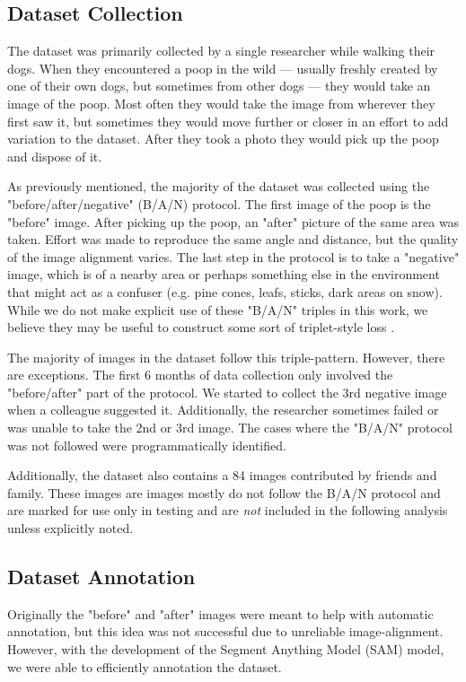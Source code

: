 \documentclass[10pt,twocolumn,letterpaper]{article}
\begin{document}
\subsection{Dataset Collection}

The dataset was primarily collected by a single researcher while walking their
dogs. When they encountered a poop in the wild --- usually freshly created by
one of their own dogs, but sometimes from other dogs --- they would take an
image of the poop. Most often they would take the image from wherever they
first saw it, but sometimes they would move further or closer in an effort to
add variation to the dataset. After they took a photo they would pick up the
poop and dispose of it.

As previously mentioned, the majority of the dataset was collected using the
"before/after/negative" (B/A/N) protocol. The first image of the poop is the
"before" image. After picking up the poop, an "after" picture of the same area
was taken. Effort was made to reproduce the same angle and distance, but the
quality of the image alignment varies. The last step in the protocol is to take
a "negative" image, which is of a nearby area or perhaps something else in the
environment that might act as a confuser (e.g. pine cones, leafs, sticks, dark
areas on snow). While we do not make explicit use of these "B/A/N" triples in
this work, we believe they may be useful to construct some sort of
triplet-style loss \cite{schroff_facenet_2015}.

The majority of images in the dataset follow this triple-pattern.  However,
there are exceptions.  The first 6 months of data collection only involved the
"before/after" part of the protocol.  We started to collect the 3rd negative
image when a colleague suggested it.  Additionally, the researcher sometimes
failed or was unable to take the 2nd or 3rd image. The cases where the "B/A/N"
protocol was not followed were programmatically identified.

Additionally, the dataset also contains a 84 images contributed by friends and
family. These images are images mostly do not follow the B/A/N protocol and are
marked for use only in testing and are \emph{not} included in the following
analysis unless explicitly noted.


\subsection{Dataset Annotation}

Originally the "before" and "after" images were meant to help with automatic
annotation, but this idea was not successful due to unreliable image-alignment.
However, with the development of the Segment Anything Model (SAM)
\cite{kirillov_segment_2023} model, we were able to efficiently annotation the
dataset. 
\end{document}

